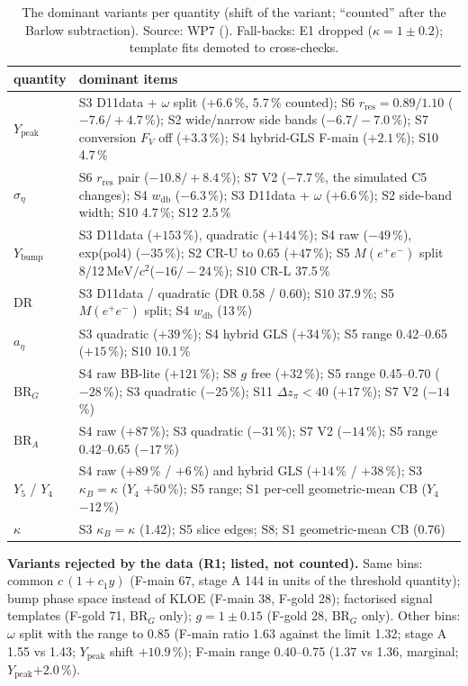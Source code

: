 \documentclass[11pt,a4paper]{article}
\newcommand{\Mee}{\ensuremath{M(e^{+}e^{-})}\xspace}
\newcommand{\MeVcc}{\ensuremath{\mathrm{MeV}/c^{2}}\xspace}
\newcommand{\code}[1]{\texttt{\detokenize{#1}}}
\newcommand{\dzpi}{\ensuremath{\Delta z_\pi}\xspace}
\newcommand{\aEta}{\ensuremath{a_\eta}\xspace}
\newcommand{\Ybump}{\ensuremath{Y_{\mathrm{bump}}}\xspace}
\newcommand{\Ypeak}{\ensuremath{Y_{\mathrm{peak}}}\xspace}
\newcommand{\kB}{\ensuremath{\kappa_B}\xspace}
\newcommand{\BRG}{\ensuremath{\mathrm{BR}_G}\xspace}
\newcommand{\BRA}{\ensuremath{\mathrm{BR}_A}\xspace}
\begin{document}
\begin{table}[H]
\centering
\caption{The dominant variants per quantity (shift of the variant; ``counted'' after the Barlow subtraction). Source: WP7
(\code{wp7_variants.txt}). Fall-backs: E1 dropped ($\kappa=1\pm0.2$); template fits demoted to cross-checks.}
\label{tab:domvar}
\small
\begin{tabular}{@{}p{2.0cm} p{13.4cm}@{}}
\toprule
quantity & dominant items \\
\midrule
\Ypeak & S3 D11data + $\omega$ split ($+6.6$\,\%, 5.7\,\% counted); S6 $r_{\mathrm{res}}=0.89/1.10$ ($-7.6/+4.7$\,\%); S2 wide/narrow side bands ($-6.7/-7.0$\,\%);
S7 conversion $F_V$ off ($+3.3$\,\%); S4 hybrid-GLS F-main ($+2.1$\,\%); S10 4.7\,\% \\
$\sigma_\eta$ & S6 $r_{\mathrm{res}}$ pair ($-10.8/+8.4$\,\%); S7 V2 ($-7.7$\,\%, the simulated C5 changes); S4 $w_{\mathrm{db}}$ ($-6.3$\,\%); S3 D11data + $\omega$
($+6.6$\,\%); S2 side-band width; S10 4.7\,\%; S12 2.5\,\% \\
\Ybump & S3 D11data ($+153$\,\%), quadratic ($+144$\,\%); S4 raw ($-49$\,\%), exp(pol4) ($-35$\,\%); S2 CR-U to 0.65 ($+47$\,\%); S5 \Mee split
8/12\,\MeVcc ($-16/-24$\,\%); S10 CR-L 37.5\,\% \\
DR & S3 D11data / quadratic (DR 0.58 / 0.60); S10 37.9\,\%; S5 \Mee split; S4 $w_{\mathrm{db}}$ (13\,\%) \\
\aEta & S3 quadratic ($+39$\,\%); S4 hybrid GLS ($+34$\,\%); S5 range 0.42--0.65 ($+15$\,\%); S10 10.1\,\% \\
\BRG & S4 raw BB-lite ($+121$\,\%); S8 $g$ free ($+32$\,\%); S5 range 0.45--0.70 ($-28$\,\%); S3 quadratic ($-25$\,\%); S11 $\dzpi<40$ ($+17$\,\%); S7 V2 ($-14$\,\%) \\
\BRA & S4 raw ($+87$\,\%); S3 quadratic ($-31$\,\%); S7 V2 ($-14$\,\%); S5 range 0.42--0.65 ($-17$\,\%) \\
$Y_5$ / $Y_4$ & S4 raw ($+89$\,\% / $+6$\,\%) and hybrid GLS ($+14$\,\% / $+38$\,\%); S3 $\kB=\kappa$ ($Y_4$ $+50$\,\%); S5 range; S1 per-cell geometric-mean CB ($Y_4$ $-12$\,\%) \\
$\kappa$ & S3 $\kB=\kappa$ (1.42); S5 slice edges; S8; S1 geometric-mean CB (0.76) \\
\bottomrule
\end{tabular}
\end{table}

\textbf{Variants rejected by the data (R1; listed, not counted).} Same bins: common $c\,(1+c_1y)$ (F-main 67, stage A 144 in units of the
threshold quantity); bump phase space instead of KLOE (F-main 38, F-gold 28); factorised signal templates (F-gold 71, \BRG only); $g=1\pm0.15$
(F-gold 28, \BRG only). Other bins: $\omega$ split with the range to 0.85 (F-main ratio 1.63 against the limit 1.32; stage A 1.55 vs 1.43;
\Ypeak shift $+10.9$\,\%); F-main range 0.40--0.75 (1.37 vs 1.36, marginal; \Ypeak $+2.0$\,\%).
\end{document}
